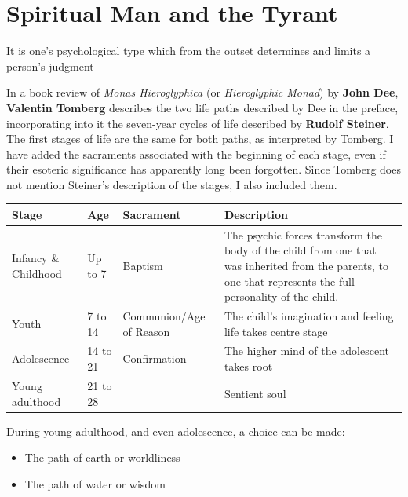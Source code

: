 \section{Spiritual Man and the Tyrant}

\begin{quotex}
It is one's psychological type which from the outset determines and limits a person's judgment
\end{quotex}


In a book review of \emph{Monas Hieroglyphica} (or \emph{Hieroglyphic Monad}) by \textbf{John Dee}, \textbf{Valentin Tomberg} describes the two life paths described by Dee in the preface, incorporating into it the seven-year cycles of life described by \textbf{Rudolf Steiner}. The first stages of life are the same for both paths, as interpreted by Tomberg. I have added the sacraments associated with the beginning of each stage, even if their esoteric significance has apparently long been forgotten. Since Tomberg does not mention Steiner's description of the stages, I also included them.

\begin{table}[h]\small\centering
\begin{tabular}{*{4}{p{}}}\toprule

Stage & Age & Sacrament & Description \\\midrule

Infancy \& Childhood & Up to 7 & Baptism & The psychic forces transform the body of the child from one that was inherited from the parents, to one that represents the full personality of the child. \\

Youth & 7 to 14 & Communion/Age of Reason & The child's imagination and feeling life takes centre stage \\

Adolescence & 14 to 21 & Confirmation & The higher mind of the adolescent takes root \\

Young adulthood & 21 to 28 & ~ & Sentient soul \\\bottomrule
\end{tabular}
\end{table}

During young adulthood, and even adolescence, a choice can be made:

\begin{itemize}


\item The path of earth or worldliness

\item The path of water or wisdom
\end{itemize}


